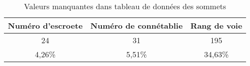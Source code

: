 \begin{table}
    \centering
    \begin{tabular}{|c|c|c|}
    \hline  \textbf{Numéro d'escroete} & \textbf{Numéro de connétablie} & \textbf{Rang de voie} \\
    \hline
    \hline 24 & 31 & 195 \\
    \hline 4,26\% & 5,51\%  & 34,63\% \\
    \hline
    \end{tabular}
    \caption{Valeurs manquantes dans tableau de données des sommets}
    \label{tab:df_nodes}
\end{table}